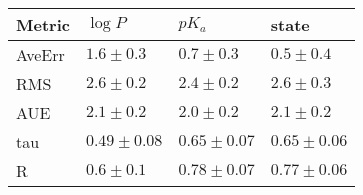 \begin{tabular}{| l |l |l | l |} 
\hline 
Metric & $\log P$ & $pK_a$ & state \\ 
\hline 
AveErr & $ 1.6 \pm 0.3$ & $ 0.7 \pm 0.3 $ & $ 0.5 \pm 0.4 $ \\ 
RMS & $ 2.6 \pm 0.2$ & $ 2.4 \pm 0.2 $ & $ 2.6 \pm 0.3 $ \\ 
AUE & $ 2.1 \pm 0.2$ & $ 2.0 \pm 0.2 $ & $ 2.1 \pm 0.2 $ \\ 
tau & $ 0.49 \pm 0.08$ & $ 0.65 \pm 0.07 $ & $ 0.65 \pm 0.06 $ \\ 
R & $ 0.6 \pm 0.1$ & $ 0.78 \pm 0.07 $ & $ 0.77 \pm 0.06 $ \\ 
\hline
\end{tabular}
